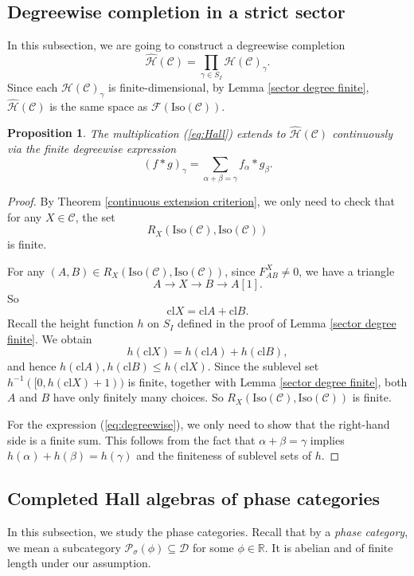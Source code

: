 \documentclass[a4paper,12pt]{amsart}
\numberwithin{equation}{section}
\newtheorem{proposition}[theorem]{Proposition}
\newcommand{\Iso}{\mathrm{Iso}}
\newcommand{\cl}{\mathrm{cl}}
\newcommand{\1}{\mathbf{1}}
\begin{document}
\subsection{Degreewise completion in a strict sector}
In this subsection, we are going to construct a degreewise completion
\[\hat{\mathcal{H}}(\mathcal{C})=\prod_{\gamma\in S_I}\mathcal{H}(\mathcal{C})_\gamma.\]
Since each $\mathcal{H}(\mathcal{C})_\gamma$ is finite-dimensional, by Lemma \ref{sector degree finite}, $\hat{\mathcal{H}}(\mathcal{C})$ is the same space as $\mathscr{F}(\Iso(\mathcal{C}))$.
\begin{proposition}\label{sector completion}
    The multiplication (\ref{eq:Hall}) extends to $\hat{\mathcal{H}}(\mathcal{C})$ continuously via the finite degreewise expression
    \begin{equation}\label{eq:degreewise}
        (f*g)_\gamma=\sum_{\alpha+\beta=\gamma}f_\alpha*g_\beta.
    \end{equation}
\end{proposition}
\begin{proof}
    By Theorem \ref{continuous extension criterion}, we only need to check that for any $X\in\mathcal{C}$, the set
    \[R_X(\Iso(\mathcal{C}),\Iso(\mathcal{C}))\]
    is finite.
    
    For any $(A,B)\in R_X(\Iso(\mathcal{C}),\Iso(\mathcal{C}))$, since $F_{AB}^X\neq0$, we have a triangle
    \[A\rightarrow X\rightarrow B\rightarrow A[1].\]
    So
    \[\cl X=\cl A+\cl B.\]
    Recall the height function $h$ on $S_I$ defined in the proof of Lemma \ref{sector degree finite}. We obtain
    \[h(\cl X)= h(\cl A)+h(\cl B),\]
    and hence $h(\cl A),h(\cl B)\leqslant h(\cl X)$. Since the sublevel set $h^{-1}([0,h(\cl X)+1))$ is finite, together with Lemma \ref{sector degree finite}, both $A$ and $B$ have only finitely many choices. So $R_X(\Iso(\mathcal{C}),\Iso(\mathcal{C}))$ is finite.

    For the expression (\ref{eq:degreewise}), we only need to show that the right-hand side is a finite sum. This follows from the fact that $\alpha+\beta=\gamma$ implies $h(\alpha)+h(\beta)=h(\gamma)$ and the finiteness of sublevel sets of $h$.
\end{proof}
\subsection{Completed Hall algebras of phase categories}
In this subsection, we study the phase categories. Recall that by a \emph{phase category}, we mean a subcategory $\mathcal{P}_\sigma(\phi)\subseteq\mathcal{D}$ for some $\phi\in\mathbb{R}$. It is abelian and of finite length under our assumption.
\end{document}
